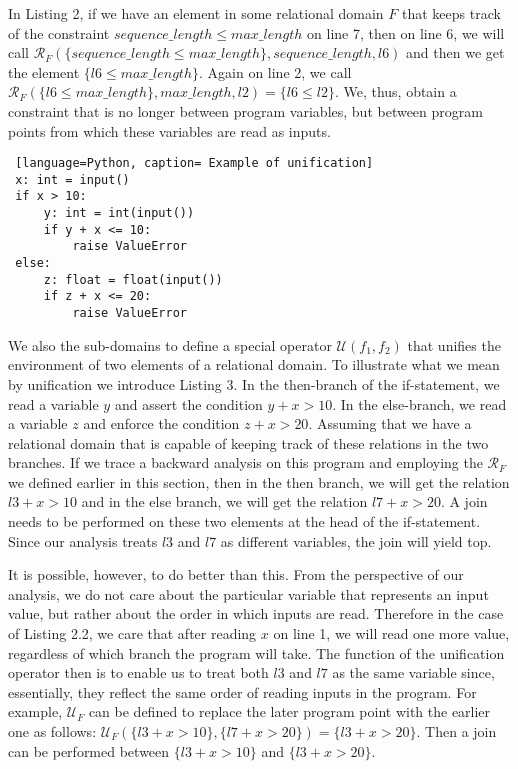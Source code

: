 \documentclass[]{report}
\begin{document}
 In Listing 2, if we have an element in some relational domain $F$ that keeps track of the constraint $sequence\_length \leq max\_length$ on line 7, then on line 6, we will call $ \mathcal{R}_{F}(\lbrace sequence\_length \leq max\_length \rbrace, sequence\_length, l6) $ and then we get the element $ \lbrace l6 \leq max\_length \rbrace$. Again on line 2, we call $ \mathcal{R}_{F}(\lbrace l6 \leq max\_length \rbrace, max\_length, l2) = \lbrace l6 \leq l2 \rbrace$. We, thus, obtain a constraint that is no longer between program variables, but between program points from which these variables are read as inputs. 
 
 \begin{lstlisting} [language=Python, caption= Example of unification]
 x: int = input()
 if x > 10:
	 y: int = int(input())
	 if y + x <= 10:
		 raise ValueError
 else:
	 z: float = float(input())
	 if z + x <= 20:
		 raise ValueError
 \end{lstlisting}
 
 We also the sub-domains to define a special operator $ \mathcal{U}(f_{1}, f_{2}) $ that unifies the environment of two elements of a relational domain. To illustrate what we mean by unification we introduce Listing 3. In the then-branch of the if-statement, we read a variable $ y $ and assert the condition $ y + x > 10 $. In the else-branch, we read a variable $ z $ and enforce the condition $ z + x > 20 $. Assuming that we have a relational domain that is capable of keeping track of these relations in the two branches. If we trace a backward analysis on this program and employing the $ \mathcal{R}_{F} $ we defined earlier in this section, then in the then branch, we will get the relation $ l3 + x > 10 $ and in the else branch, we will get the relation $ l7 + x > 20 $. A join needs to be performed on these two elements at the head of the if-statement. Since our analysis treats $ l3 $ and $ l7 $ as different variables, the join will yield top. 
 
 It is possible, however, to do better than this. From the perspective of our analysis, we do not care about the particular variable that represents an input value, but rather about the order in which inputs are read. Therefore in the case of Listing 2.2, we care that after reading $ x $ on line 1, we will read one more value, regardless of which branch the program will take. The function of the unification operator then is to enable us to treat both $ l3 $ and $ l7 $ as the same variable since, essentially, they reflect the same order of reading inputs in the program. For example, $ \mathcal{U}_{F} $ can be defined to replace the later program point with the earlier one as follows: $ \mathcal{U}_{F}(\lbrace l3 + x > 10 \rbrace, \lbrace l7 + x > 20 \rbrace) =  \lbrace l3 + x > 20 \rbrace$. Then a join can be performed between $ \lbrace l3 + x > 10 \rbrace $ and $ \lbrace l3 + x > 20 \rbrace $. 
\end{document}
